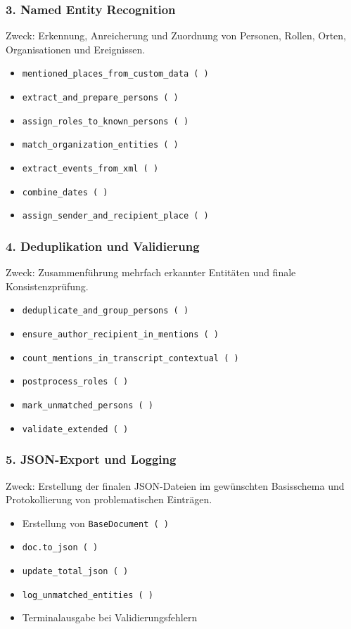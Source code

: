 \documentclass[12pt, a4paper, ngerman, bidi=default]{article}
\begin{document}
\subsubsection*{3. Named Entity Recognition}
Zweck: Erkennung, Anreicherung und Zuordnung von Personen, Rollen, Orten, Organisationen und Ereignissen.
\begin{itemize}
\item \texttt{mentioned\_places\_from\_custom\_data~(~)}
\item \texttt{extract\_and\_prepare\_persons~(~)}
\item \texttt{assign\_roles\_to\_known\_persons~(~)}
\item \texttt{match\_organization\_entities~(~)}
\item \texttt{extract\_events\_from\_xml~(~)}
\item \texttt{combine\_dates~(~)}
\item \texttt{assign\_sender\_and\_recipient\_place~(~)}
\end{itemize}


\subsubsection*{4. Deduplikation und Validierung}
Zweck: Zusammenführung mehrfach erkannter Entitäten und finale Konsistenzprüfung.
\begin{itemize}
\item \texttt{deduplicate\_and\_group\_persons~(~)}
\item \texttt{ensure\_author\_recipient\_in\_mentions~(~)}
\item \texttt{count\_mentions\_in\_transcript\_contextual~(~)}
\item \texttt{postprocess\_roles~(~)}
\item \texttt{mark\_unmatched\_persons~(~)}
\item \texttt{validate\_extended~(~)}
\end{itemize}

\subsubsection*{5. JSON-Export und Logging}
Zweck: Erstellung der finalen JSON-Dateien im gewünschten Basisschema und Protokollierung von problematischen Einträgen.
\begin{itemize}
\item Erstellung von \texttt{BaseDocument~(~)}
\item \texttt{doc.to\_json~(~)}
\item \texttt{update\_total\_json~(~)}
\item \texttt{log\_unmatched\_entities~(~)}
\item Terminalausgabe bei Validierungsfehlern
\end{itemize}
\end{document}
